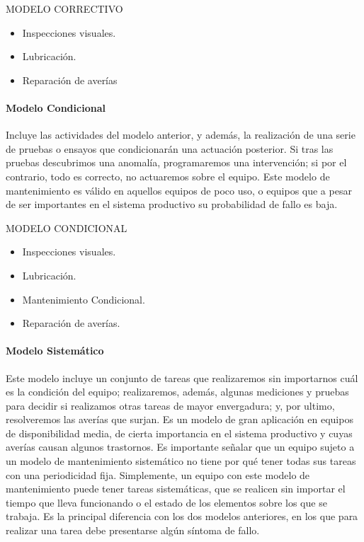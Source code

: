 \begin{tcolorbox}
MODELO CORRECTIVO
\tcblower
\begin{itemize}
 \item Inspecciones visuales.
 \item Lubricación.
 \item Reparación de averías
\end{itemize}
 \end{tcolorbox}

\paragraph{Modelo Condicional}
Incluye las actividades del modelo anterior, y además, la realización de
una serie de pruebas o ensayos que condicionarán una actuación posterior. Si
tras las pruebas descubrimos una anomalía, programaremos una intervención;
si por el contrario, todo es correcto, no actuaremos sobre el equipo.
Este modelo de mantenimiento es válido en aquellos equipos de poco uso,
o equipos que a pesar de ser importantes en el sistema productivo su probabilidad de fallo es baja.

\begin{tcolorbox}
MODELO CONDICIONAL
\tcblower
\begin{itemize}
\item Inspecciones visuales.
\item Lubricación.
\item Mantenimiento Condicional.
\item Reparación de averías.
\end{itemize}

\end{tcolorbox}

\paragraph{Modelo Sistemático}
Este modelo incluye un conjunto de tareas que realizaremos sin importarnos cuál es la condición del equipo; realizaremos, además, algunas mediciones y pruebas para decidir si realizamos otras tareas de mayor envergadura; y, por ultimo, resolveremos las averías que surjan. Es un modelo de
gran aplicación en equipos de disponibilidad media, de cierta importancia en
el sistema productivo y cuyas averías causan algunos trastornos. Es importante señalar que un equipo sujeto a un modelo de mantenimiento sistemático no tiene por qué tener todas sus tareas con una periodicidad fija. Simplemente, un equipo con este modelo de mantenimiento puede tener tareas sistemáticas, que se realicen sin importar el tiempo que lleva funcionando o el estado de los elementos sobre los que se trabaja. Es la principal diferencia con los dos modelos anteriores, en los que para realizar una tarea debe presentarse algún síntoma de fallo.

